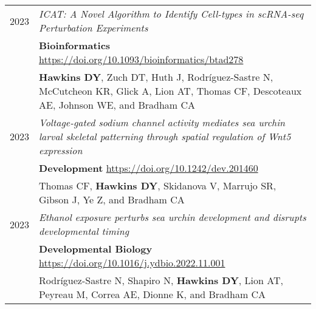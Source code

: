 \documentclass[a4paper,10pt]{report}
\begin{document}
\section{\color{linkcolour}{Selected Publications}}
\begin{tabular}{rp{11cm}}
	\textsc{2023} & \emph{ICAT: A Novel Algorithm to Identify Cell-types in scRNA-seq Perturbation Experiments}                                                                   \\
	              & \small \textbf{Bioinformatics} \href{https://doi.org/10.1093/bioinformatics/btad278}{https://doi.org/10.1093/bioinformatics/btad278}                          \\
	              & \footnotesize \textbf{Hawkins DY}, Zuch DT, Huth J, Rodríguez-Sastre N, McCutcheon KR, Glick A, Lion AT, Thomas CF, Descoteaux AE, Johnson WE, and Bradham CA \\
	\textsc{2023} & \emph{Voltage-gated sodium channel activity mediates sea urchin larval skeletal patterning through spatial regulation of Wnt5 expression}                     \\
	              & \small \textbf{Development} \href{https://doi.org/10.1242/dev.201460}{https://doi.org/10.1242/dev.201460}                                                     \\
	              & \footnotesize Thomas CF, \textbf{Hawkins DY}, Skidanova V, Marrujo SR, Gibson J, Ye Z, and Bradham CA                                                         \\
	\textsc{2023} & \emph{Ethanol exposure perturbs sea urchin development and disrupts developmental timing}                                                                     \\
	              & \small \textbf{Developmental Biology} \href{https://doi.org/10.1016/j.ydbio.2022.11.001}{https://doi.org/10.1016/j.ydbio.2022.11.001}                         \\
	              & \footnotesize Rodríguez-Sastre N, Shapiro N, \textbf{Hawkins DY}, Lion AT, Peyreau M, Correa AE, Dionne K, and Bradham CA                                     \\
\end{tabular}

\end{document}
